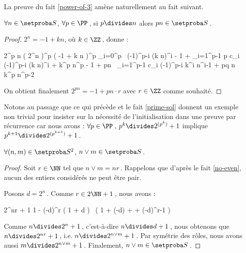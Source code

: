 La preuve du fait \ref{power-of-3} amène naturellement au fait suivant.

\begin{fact} \label{prime-divisor}
	$\forall n \in \ourset$, $\forall p \in \PP$\,,
	si $p \divides n$ alors $p n \in \ourset$\,.
\end{fact}

\begin{proof}
	$2^n = -1 + k n$, où $k \in \ZZ$\,, donne :

    \medskip
    
    \begin{stepcalc}[style=sar]
    	2^{p n}
    \explnext{}
    	\big( 2^n \big)^p
    \explnext{}
    	\big( -1 + k n \big)^p
    \explnext{}
    	\dsum_{i=0}^p  \, (-1)^{p-i} \cdot (k n)^i
    	- 1 + \dsum_{i=1}^{p-1} p c_i \cdot (-1)^{p-i} \cdot (k n)^i + k^p \cdot n^p
    	- 1 + pn \, \dsum_{i=1}^{p-1} c_i \cdot (-1)^{p-i} \cdot k^i n^{i-1} + pq \cdot n \cdot k^p \cdot n^{p-2}
    \end{stepcalc}

    \medskip

    On obtient finalement $2^{p n} = - 1 + pn \cdot r$ avec $r \in \ZZ$ comme souhaité.
\end{proof}




Notons au passage que ce qui précède et le fait \ref{prime-sol} donnent un exemple non trivial pour insister sur la nécessité de l'initialisation dans une preuve par récurrence car nous avons :
$\forall p \in \PP$\,, $p^k \divides 2^{( p^k )} + 1$ 
implique
$p^{k+1} \divides 2^{( p^{k+1} )} + 1$\,.




\begin{fact} \label{lcm}
	$\forall (n , m) \in \ourset^2$, $n \vee m \in \ourset$\,.
\end{fact}

\begin{proof}
	Soit $r \in \NN$ tel que $n \vee m = n r$\,. Rappelons que d'après le fait \ref{no-even}, aucun des entiers considérés ne peut être pair.
	
	\medskip
	
	Posons $d = 2^n$\,. Comme $r \in 2 \NN + 1$\,, nous avons :
	
	\medskip
	
	\begin{stepcalc}[style = ar*]
		2^{nr} + 1
		1 - (-d)^r
	\explnext{}
		\big( 1 + d \big) \, \big( 1 + (-d) + \cdots + (-d)^{r-1} \big)
	\end{stepcalc}
	
	\medskip
	
	Comme $n \divides 2^n + 1$\,, c'est-à-dire $n \divides d + 1$\,, nous obtenons que $n \divides 2^{nr} + 1$\,, i.e. $n \divides 2^{n \vee m} + 1$\,.
	Par symétrie des rôles, nous avons aussi $m \divides 2^{n \vee m} + 1$\,.
	Finalement, $n \vee m \in \ourset$\,.
\end{proof}


